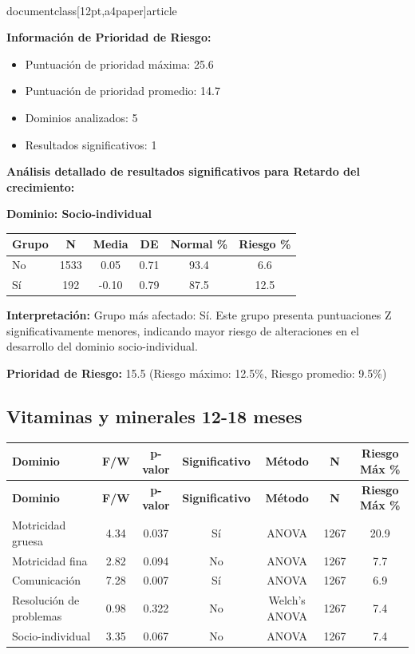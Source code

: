 \\documentclass[12pt,a4paper]{article}
\begin{document}
\textbf{Información de Prioridad de Riesgo:}
\begin{itemize}
\item Puntuación de prioridad máxima: 25.6
\item Puntuación de prioridad promedio: 14.7
\item Dominios analizados: 5
\item Resultados significativos: 1
\end{itemize}


\textbf{Análisis detallado de resultados significativos para Retardo del crecimiento:}


\textbf{Dominio: Socio-individual}


\begin{center}
\begin{tabular}{|l|c|c|c|c|c|}
\hline
\textbf{Grupo} & \textbf{N} & \textbf{Media} & \textbf{DE} & \textbf{Normal \%} & \textbf{Riesgo \%} \\
\hline
No & 1533 & 0.05 & 0.71 & 93.4 & 6.6 \\
Sí & 192 & -0.10 & 0.79 & 87.5 & 12.5 \\

\hline
\end{tabular}
\end{center}


\textbf{Interpretación:} Grupo más afectado: Sí. Este grupo presenta puntuaciones Z significativamente menores, indicando mayor riesgo de alteraciones en el desarrollo del dominio socio-individual.

\textbf{Prioridad de Riesgo:} 15.5 (Riesgo máximo: 12.5\%, Riesgo promedio: 9.5\%)


\vspace{0.5cm}


\subsection{Vitaminas y minerales 12-18 meses}


\begin{longtable}{|l|c|c|c|c|c|c|}
\hline
\textbf{Dominio} & \textbf{F/W} & \textbf{p-valor} & \textbf{Significativo} & \textbf{Método} & \textbf{N} & \textbf{Riesgo Máx \%} \\
\hline
\endfirsthead

\hline
\textbf{Dominio} & \textbf{F/W} & \textbf{p-valor} & \textbf{Significativo} & \textbf{Método} & \textbf{N} & \textbf{Riesgo Máx \%} \\
\hline
\endhead

\hline
\endfoot

\hline
\endlastfoot

Motricidad gruesa & 4.34 & 0.037 & Sí & ANOVA & 1267 & 20.9 \\
Motricidad fina & 2.82 & 0.094 & No & ANOVA & 1267 & 7.7 \\
Comunicación & 7.28 & 0.007 & Sí & ANOVA & 1267 & 6.9 \\
Resolución de problemas & 0.98 & 0.322 & No & Welch's ANOVA & 1267 & 7.4 \\
Socio-individual & 3.35 & 0.067 & No & ANOVA & 1267 & 7.4 \\

\end{longtable}
\end{document}
